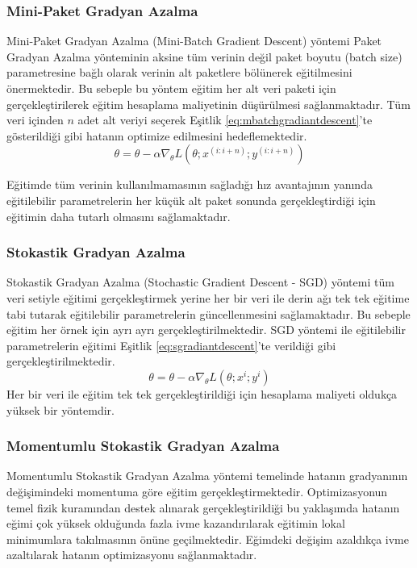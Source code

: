\subsubsection{Mini-Paket Gradyan Azalma}
Mini-Paket Gradyan Azalma (Mini-Batch Gradient Descent) yöntemi Paket Gradyan Azalma yönteminin aksine tüm verinin değil paket boyutu (batch size) parametresine bağlı olarak verinin alt paketlere bölünerek eğitilmesini önermektedir. Bu sebeple bu yöntem eğitim her alt veri paketi için gerçekleştirilerek eğitim hesaplama maliyetinin düşürülmesi sağlanmaktadır. Tüm veri içinden $n$ adet alt veriyi seçerek Eşitlik \ref{eq:mbatchgradiantdescent}'te gösterildiği gibi hatanın optimize edilmesini hedeflemektedir.
\begin{equation}
	\label{eq:mbatchgradiantdescent}
	\theta = \theta - \alpha \nabla_{\theta}L(\theta;x^{(i:i+n)};y^{(i:i+n)})
\end{equation} 

Eğitimde tüm verinin kullanılmamasının sağladığı hız avantajının yanında eğitilebilir parametrelerin her küçük alt paket sonunda gerçekleştirdiği için eğitimin daha tutarlı olmasını sağlamaktadır.

\subsubsection{Stokastik Gradyan Azalma}
Stokastik Gradyan Azalma (Stochastic Gradient Descent - SGD) yöntemi tüm veri setiyle eğitimi gerçekleştirmek yerine her bir veri ile derin ağı tek tek eğitime tabi tutarak eğitilebilir parametrelerin güncellenmesini sağlamaktadır. Bu sebeple eğitim her örnek için ayrı ayrı gerçekleştirilmektedir. SGD yöntemi ile eğitilebilir parametrelerin eğitimi Eşitlik \ref{eq:sgradiantdescent}'te verildiği gibi gerçekleştirilmektedir.
\begin{equation}
	\label{eq:sgradiantdescent}
	\theta = \theta - \alpha \nabla_{\theta}L(\theta;x^{i};y^{i})
\end{equation} 
Her bir veri ile eğitim tek tek gerçekleştirildiği için hesaplama maliyeti oldukça yüksek bir yöntemdir.

\subsubsection{Momentumlu Stokastik Gradyan Azalma}
Momentumlu Stokastik Gradyan Azalma yöntemi temelinde hatanın gradyanının değişimindeki momentuma göre eğitim gerçekleştirmektedir. Optimizasyonun temel fizik kuramından destek alınarak gerçekleştirildiği bu yaklaşımda hatanın eğimi çok yüksek olduğunda fazla ivme kazandırılarak eğitimin lokal minimumlara takılmasının önüne geçilmektedir. Eğimdeki değişim azaldıkça ivme azaltılarak hatanın optimizasyonu sağlanmaktadır.

